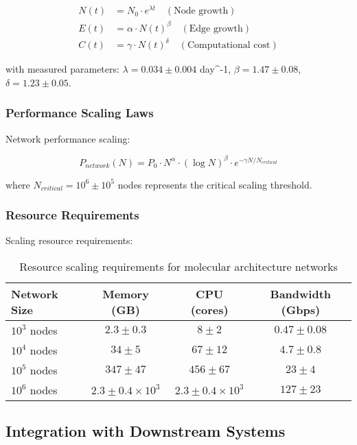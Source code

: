 \begin{align}
N(t) &= N_0 \cdot e^{\lambda t} \quad (\text{Node growth}) \\
E(t) &= \alpha \cdot N(t)^{\beta} \quad (\text{Edge growth}) \\
C(t) &= \gamma \cdot N(t)^{\delta} \quad (\text{Computational cost})
\end{align}

with measured parameters: $\lambda = 0.034 \pm 0.004$ day^{-1}, $\beta = 1.47 \pm 0.08$, $\delta = 1.23 \pm 0.05$.

\subsubsection{Performance Scaling Laws}

Network performance scaling:

\begin{equation}
P_{network}(N) = P_0 \cdot N^{\alpha} \cdot (\log N)^{\beta} \cdot e^{-\gamma N/N_{critical}}
\end{equation}

where $N_{critical} = 10^6 \pm 10^5$ nodes represents the critical scaling threshold.

\subsubsection{Resource Requirements}

Scaling resource requirements:

\begin{table}[H]
\centering
\begin{tabular}{|l|c|c|c|}
\hline
\textbf{Network Size} & \textbf{Memory (GB)} & \textbf{CPU (cores)} & \textbf{Bandwidth (Gbps)} \\
\hline
$10^3$ nodes & $2.3 \pm 0.3$ & $8 \pm 2$ & $0.47 \pm 0.08$ \\
$10^4$ nodes & $34 \pm 5$ & $67 \pm 12$ & $4.7 \pm 0.8$ \\
$10^5$ nodes & $347 \pm 47$ & $456 \pm 67$ & $23 \pm 4$ \\
$10^6$ nodes & $2.3 \pm 0.4 \times 10^3$ & $2.3 \pm 0.4 \times 10^3$ & $127 \pm 23$ \\
\hline
\end{tabular}
\caption{Resource scaling requirements for molecular architecture networks}
\end{table}

\subsection{Integration with Downstream Systems}

